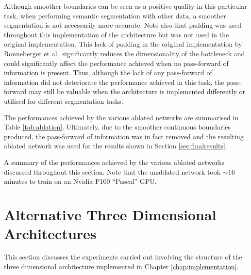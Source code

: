 Although smoother boundaries can be seen as a positive quality in this particular task, when performing semantic segmentation with other data, a smoother segmentation is not necessarily more accurate. Note also that padding was used throughout this implementation of the architecture but was not used in the original implementation. This lack of padding in the original implementation by Ronneberger et al.\ significantly reduces the dimensionality of the bottleneck and could significantly affect the performance achieved when no pass-forward of information is present. Thus, although the lack of any pass-forward of information did not deteriorate the performance achieved in this task, the pass-forward may still be valuable when the architecture is implemented differently or utilised for different segmentation tasks.

The performances achieved by the various ablated networks are summarised in Table \ref{tab:ablation}. Ultimately, due to the smoother continuous boundaries produced, the pass-forward of information was in fact removed and the resulting ablated network was used for the results shown in Section \ref{sec:finalresults}.

\begin{table}[!t]
    \centering
    \caption{A summary of the performances achieved by the various ablated networks discussed throughout this section. Note that the unablated network took ${\sim}16$ minutes to train on an Nvidia P100 ``Pascal'' GPU.}
    
    \label{tab:ablation}
\end{table}

\section{Alternative Three Dimensional Architectures}

This section discusses the experiments carried out involving the structure of the three dimensional architecture implemented in Chapter \ref{chap:implementation}.



